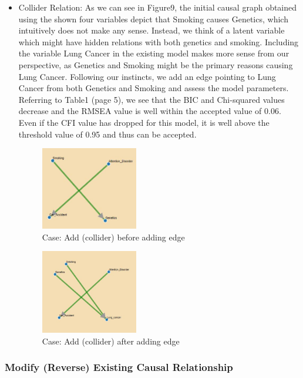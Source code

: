 \documentclass{vgtc}                          %
\begin{document}
\begin{itemize}
    \item Collider Relation: As we can see in Figure9, the initial causal graph obtained using the shown four variables depict that Smoking causes Genetics, which intuitively does not make any sense. Instead, we think of a latent variable which might have hidden relations with both genetics and smoking. Including the variable Lung Cancer in the existing model makes more sense from our perspective, as Genetics and Smoking might be the primary reasons causing Lung Cancer. Following our instincts, we add an edge pointing to Lung Cancer from both Genetics and Smoking and assess the model parameters. Referring to Table1 (page 5), we see that the BIC and Chi-squared values decrease and the RMSEA value is well within the accepted value of 0.06. Even if the CFI value has dropped for this model, it is well above the threshold value of 0.95 and thus can be accepted. 
    
    \begin{figure}[H]
      \caption{Case: Add (collider) before adding edge}
      \centering
      \includegraphics[width=0.4\textwidth]{c3_1}
    \end{figure}

    \begin{figure}[H]
      \caption{Case: Add (collider) after adding edge}
      \centering
      \includegraphics[width=0.4\textwidth]{c3_2}
    \end{figure}
    \end{itemize}



\subsubsection{Modify (Reverse) Existing Causal Relationship}
\end{document}
